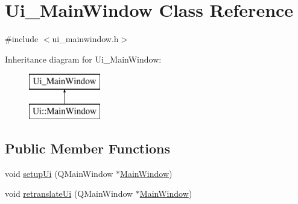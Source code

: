 \hypertarget{class_ui___main_window}{\section{Ui\-\_\-\-Main\-Window Class Reference}
\label{class_ui___main_window}
}


{\ttfamily \#include $<$ui\-\_\-mainwindow.\-h$>$}

Inheritance diagram for Ui\-\_\-\-Main\-Window\-:\begin{figure}[H]
\begin{center}
\leavevmode
\includegraphics[height=2.000000cm]{class_ui___main_window}
\end{center}
\end{figure}
\subsection*{Public Member Functions}
\begin{DoxyCompactItemize}
\item 
void \hyperlink{class_ui___main_window_acf4a0872c4c77d8f43a2ec66ed849b58}{setup\-Ui} (Q\-Main\-Window $\ast$\hyperlink{class_main_window}{Main\-Window})
\item 
void \hyperlink{class_ui___main_window_a097dd160c3534a204904cb374412c618}{retranslate\-Ui} (Q\-Main\-Window $\ast$\hyperlink{class_main_window}{Main\-Window})
\end{DoxyCompactItemize}
